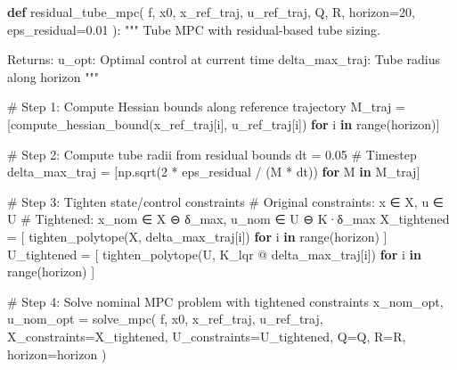 \documentclass[
  letterpaper,
  DIV=11,
  numbers=noendperiod]{scrartcl}
\newenvironment{Shaded}{\begin{snugshade}}{\end{snugshade}}
\newcommand{\BuiltInTok}[1]{\textcolor[rgb]{0.00,0.23,0.31}{#1}}
\newcommand{\CommentTok}[1]{\textcolor[rgb]{0.37,0.37,0.37}{#1}}
\newcommand{\ControlFlowTok}[1]{\textcolor[rgb]{0.00,0.23,0.31}{\textbf{#1}}}
\newcommand{\DecValTok}[1]{\textcolor[rgb]{0.68,0.00,0.00}{#1}}
\newcommand{\FloatTok}[1]{\textcolor[rgb]{0.68,0.00,0.00}{#1}}
\newcommand{\KeywordTok}[1]{\textcolor[rgb]{0.00,0.23,0.31}{\textbf{#1}}}
\newcommand{\NormalTok}[1]{\textcolor[rgb]{0.00,0.23,0.31}{#1}}
\newcommand{\OperatorTok}[1]{\textcolor[rgb]{0.37,0.37,0.37}{#1}}
\begin{document}
\begin{Shaded}
\begin{Highlighting}[]
\KeywordTok{def}\NormalTok{ residual\_tube\_mpc(}
\NormalTok{    f, x0, x\_ref\_traj, u\_ref\_traj,}
\NormalTok{    Q, R, horizon}\OperatorTok{=}\DecValTok{20}\NormalTok{, eps\_residual}\OperatorTok{=}\FloatTok{0.01}
\NormalTok{):}
    \CommentTok{"""}
\CommentTok{    Tube MPC with residual{-}based tube sizing.}

\CommentTok{    Returns:}
\CommentTok{        u\_opt: Optimal control at current time}
\CommentTok{        delta\_max\_traj: Tube radius along horizon}
\CommentTok{    """}

    \CommentTok{\# Step 1: Compute Hessian bounds along reference trajectory}
\NormalTok{    M\_traj }\OperatorTok{=}\NormalTok{ [compute\_hessian\_bound(x\_ref\_traj[i], u\_ref\_traj[i])}
              \ControlFlowTok{for}\NormalTok{ i }\KeywordTok{in} \BuiltInTok{range}\NormalTok{(horizon)]}

    \CommentTok{\# Step 2: Compute tube radii from residual bounds}
\NormalTok{    dt }\OperatorTok{=} \FloatTok{0.05}  \CommentTok{\# Timestep}
\NormalTok{    delta\_max\_traj }\OperatorTok{=}\NormalTok{ [np.sqrt(}\DecValTok{2} \OperatorTok{*}\NormalTok{ eps\_residual }\OperatorTok{/}\NormalTok{ (M }\OperatorTok{*}\NormalTok{ dt))}
                      \ControlFlowTok{for}\NormalTok{ M }\KeywordTok{in}\NormalTok{ M\_traj]}

    \CommentTok{\# Step 3: Tighten state/control constraints}
    \CommentTok{\# Original constraints: x ∈ X, u ∈ U}
    \CommentTok{\# Tightened: x\_nom ∈ X ⊖ δ\_max, u\_nom ∈ U ⊖ K·δ\_max}
\NormalTok{    X\_tightened }\OperatorTok{=}\NormalTok{ [}
\NormalTok{        tighten\_polytope(X, delta\_max\_traj[i])}
        \ControlFlowTok{for}\NormalTok{ i }\KeywordTok{in} \BuiltInTok{range}\NormalTok{(horizon)}
\NormalTok{    ]}
\NormalTok{    U\_tightened }\OperatorTok{=}\NormalTok{ [}
\NormalTok{        tighten\_polytope(U, K\_lqr }\OperatorTok{@}\NormalTok{ delta\_max\_traj[i])}
        \ControlFlowTok{for}\NormalTok{ i }\KeywordTok{in} \BuiltInTok{range}\NormalTok{(horizon)}
\NormalTok{    ]}

    \CommentTok{\# Step 4: Solve nominal MPC problem with tightened constraints}
\NormalTok{    x\_nom\_opt, u\_nom\_opt }\OperatorTok{=}\NormalTok{ solve\_mpc(}
\NormalTok{        f, x0, x\_ref\_traj, u\_ref\_traj,}
\NormalTok{        X\_constraints}\OperatorTok{=}\NormalTok{X\_tightened,}
\NormalTok{        U\_constraints}\OperatorTok{=}\NormalTok{U\_tightened,}
\NormalTok{        Q}\OperatorTok{=}\NormalTok{Q, R}\OperatorTok{=}\NormalTok{R, horizon}\OperatorTok{=}\NormalTok{horizon}
\NormalTok{    )}


\end{Highlighting}
\end{Shaded}
\end{document}
